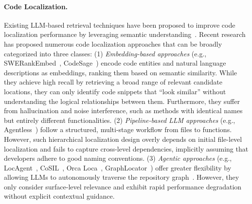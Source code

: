 \paragraph{Code Localization.}
Existing LLM-based retrieval techniques have been proposed to improve code localization performance by leveraging semantic understanding~\cite{xia2024agentless,chen-etal-2025-locagent,reddy2025swerank,wang2024openhands,yang2024swe,jiang2025cosil,zhang2024autocoderover,tao2024magis,xie2025swe,ma2025sorft,ma2508tool}.
Recent research has proposed numerous code localization approaches that can be broadly categorized
into three classes: (1) \textit{Embedding-based approaches} (e.g.,
SWERankEmbed~\cite{reddy2025swerank}, CodeSage~\cite{zhang2024code}) encode code entities and natural language descriptions as
embeddings, ranking them based on semantic similarity. While they achieve high recall by retrieving
a broad range of relevant candidate locations, they can only identify code snippets that ``look
similar'' without understanding the logical relationships between them.
Furthermore, they suffer from hallucination and noise interference, such as methods with identical
names but entirely different functionalities.
(2) \textit{Pipeline-based LLM approaches} (e.g., Agentless~\cite{xia2024agentless}) follow a
structured, multi-stage workflow from files to functions.
However, such hierarchical localization design overly depends on initial file-level
localization and fails to capture cross-level dependencies, implicitly assuming that developers
adhere to good naming conventions.
(3) \textit{Agentic approaches} (e.g., LocAgent~\cite{chen-etal-2025-locagent},
CoSIL~\cite{jiang2025cosil}, Orca Loca~\cite{yu2025orcalocallmagentframework}, GraphLocator~\cite{liu2025graphlocator}) offer greater flexibility by
allowing LLMs to autonomously traverse the repository graph~\cite{lekssays2025llmxcpg}.
However, they only consider surface-level relevance and exhibit rapid performance degradation
without explicit contextual guidance.

